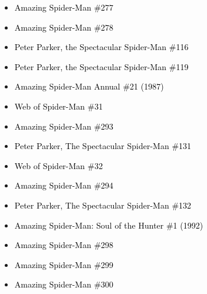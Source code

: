 \documentclass[12pt]{article}
\newcommand{\checkbox}{\raisebox{0.0ex}{\fbox{\rule{0ex}{1.5ex} \rule{1.5ex}{0ex}}}}
\begin{document}
\begin{center}
\begin{tcolorbox}[colback=white!95!gray, colframe=black, width=0.9\textwidth, arc=4mm, auto outer arc, boxrule=0.8pt]
\begin{itemize}[left=0pt,label={\checkbox}]
    \item \textcolor{black}{Amazing Spider-Man \#277}
    \item \textcolor{black}{Amazing Spider-Man \#278}
    \item \textcolor{black}{Peter Parker, the Spectacular Spider-Man \#116}
    \item \textcolor{black}{Peter Parker, the Spectacular Spider-Man \#119}
    \item \textcolor{black}{Amazing Spider-Man Annual \#21 (1987)}
    \item \textcolor{black}{Web of Spider-Man \#31}
    \item \textcolor{black}{Amazing Spider-Man \#293}
    \item \textcolor{black}{Peter Parker, The Spectacular Spider-Man \#131}
    \item \textcolor{black}{Web of Spider-Man \#32}
    \item \textcolor{black}{Amazing Spider-Man \#294}
    \item \textcolor{black}{Peter Parker, The Spectacular Spider-Man \#132}
    \item \textcolor{black}{Amazing Spider-Man: Soul of the Hunter \#1 (1992)}
    \item \textcolor{black}{Amazing Spider-Man \#298}
    \item \textcolor{black}{Amazing Spider-Man \#299}
    \item \textcolor{black}{Amazing Spider-Man \#300}
\end{itemize}
\end{tcolorbox}
\end{center}
\end{document}
